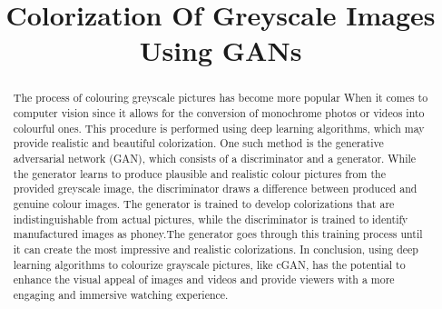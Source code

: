 \documentclass[conference]{IEEEtran}
\begin{document}
\title{Colorization Of Greyscale Images Using GANs}

\author{
\and
{}
\and
{}
}

\maketitle

\begin{abstract}\label{Abstract}
The process of colouring greyscale pictures has become more popular When it comes to computer vision since it allows for the conversion of monochrome photos or videos into colourful ones. This procedure is performed using deep learning algorithms, which may provide realistic and beautiful colorization. One such method is the generative adversarial network (GAN), which consists of a discriminator and a generator. While the generator learns to produce plausible and realistic colour pictures from the provided greyscale image, the discriminator draws a difference between produced and genuine colour images. The generator is trained to develop colorizations that are indistinguishable from actual pictures, while the discriminator is trained to identify manufactured images as phoney.The generator goes through this training process until it can create the most impressive and realistic colorizations. In conclusion, using deep learning algorithms to colourize grayscale pictures, like cGAN, has the potential to enhance the visual appeal of images and videos and provide viewers with a more engaging and immersive watching experience.
\end{abstract}
\end{document}
